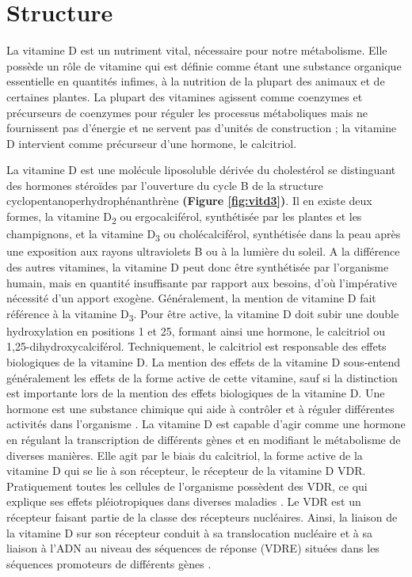 \documentclass[
  a4paper,
  DIV=11,
  numbers=noendperiod,
  listof=totoc]{scrreprt}
\begin{document}
\hypertarget{structure}{%
\section{Structure}\label{structure}}

La vitamine D est un nutriment vital, nécessaire pour notre métabolisme.
Elle possède un rôle de vitamine qui est définie comme étant une
substance organique essentielle en quantités infimes, à la nutrition de
la plupart des animaux et de certaines plantes. La plupart des vitamines
agissent comme coenzymes et précurseurs de coenzymes pour réguler les
processus métaboliques mais ne fournissent pas d'énergie et ne servent
pas d'unités de construction \autocite{Ellison.2020} ; la vitamine D
intervient comme précurseur d'une hormone, le calcitriol.

La vitamine D est une molécule liposoluble dérivée du cholestérol se
distinguant des hormones stéroïdes par l'ouverture du cycle B de la
structure cyclopentanoperhydrophénanthrène \autocite{Norman.2008}
\textbf{(Figure \ref{fig:vitd3})}. Il en existe deux formes, la vitamine
D\textsubscript{2} ou ergocalciférol, synthétisée par les plantes et les
champignons, et la vitamine D\textsubscript{3} ou cholécalciférol,
synthétisée dans la peau après une exposition aux rayons ultraviolets B
ou à la lumière du soleil. A la différence des autres vitamines, la
vitamine D peut donc être synthétisée par l'organisme humain, mais en
quantité insuffisante par rapport aux besoins, d'où l'impérative
nécessité d'un apport exogène. Généralement, la mention de vitamine D
fait référence à la vitamine D\textsubscript{3}. Pour être active, la
vitamine D doit subir une double hydroxylation en positions 1 et 25,
formant ainsi une hormone, le calcitriol ou 1,25-dihydroxycalciférol.
Techniquement, le calcitriol est responsable des effets biologiques de
la vitamine D. La mention des effets de la vitamine D sous-entend
généralement les effets de la forme active de cette vitamine, sauf si la
distinction est importante lors de la mention des effets biologiques de
la vitamine D. Une hormone est une substance chimique qui aide à
contrôler et à réguler différentes activités dans l'organisme
\autocite{Ellison.2020}. La vitamine D est capable d'agir comme une
hormone en régulant la transcription de différents gènes et en modifiant
le métabolisme de diverses manières. Elle agit par le biais du
calcitriol, la forme active de la vitamine D qui se lie à son récepteur,
le récepteur de la vitamine D \acs{VDR}. Pratiquement toutes les
cellules de l'organisme possèdent des VDR, ce qui explique ses effets
pléiotropiques dans diverses maladies
\autocite{Ellison.2020,Caprio.2017,Norman.2008}. Le \ac{VDR} est un
récepteur faisant partie de la classe des récepteurs nucléaires. Ainsi,
la liaison de la vitamine D sur son récepteur conduit à sa translocation
nucléaire et à sa liaison à l'ADN au niveau des séquences de réponse
(\acs{VDRE}) situées dans les séquences promoteurs de différents gènes
\autocite{Bouillon.2008}.
\end{document}
